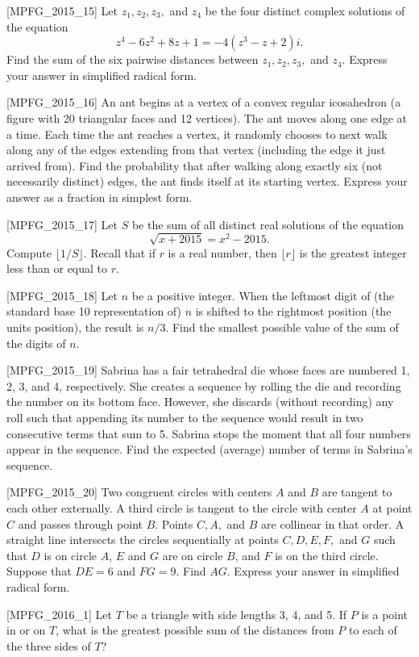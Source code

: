 [MPFG_2015_15]
Let $z_1, z_2, z_3,$ and $z_4$ be the four distinct complex solutions of the equation
$$z^4 - 6z^2 + 8z + 1 = -4(z^3 - z + 2)i.$$
Find the sum of the six pairwise distances between $z_1, z_2, z_3,$ and $z_4$. Express your answer in simplified radical form.

[MPFG_2015_16]
An ant begins at a vertex of a convex regular icosahedron (a figure with 20 triangular faces and 12 vertices). The ant moves along one edge at a time. Each time the ant reaches a vertex, it randomly chooses to next walk along any of the edges extending from that vertex (including the edge it just arrived from). Find the probability that after walking along exactly six (not necessarily distinct) edges, the ant finds itself at its starting vertex. Express your answer as a fraction in simplest form.

[MPFG_2015_17]
Let $S$ be the sum of all distinct real solutions of the equation
$$\sqrt{x+2015} = x^2 - 2015.$$
Compute $\lfloor 1/S \rfloor$. Recall that if $r$ is a real number, then $\lfloor r \rfloor$ is the greatest integer less than or equal to $r$.

[MPFG_2015_18]
Let $n$ be a positive integer. When the leftmost digit of (the standard base 10 representation of) $n$ is shifted to the rightmost position (the units position), the result is $n/3$. Find the smallest possible value of the sum of the digits of $n$.

[MPFG_2015_19]
Sabrina has a fair tetrahedral die whose faces are numbered 1, 2, 3, and 4, respectively. She creates a sequence by rolling the die and recording the number on its bottom face. However, she discards (without recording) any roll such that appending its number to the sequence would result in two consecutive terms that sum to 5. Sabrina stops the moment that all four numbers appear in the sequence. Find the expected (average) number of terms in Sabrina's sequence.

[MPFG_2015_20]
Two congruent circles with centers $A$ and $B$ are tangent to each other externally. A third circle is tangent to the circle with center $A$ at point $C$ and passes through point $B$. Points $C, A,$ and $B$ are collinear in that order. A straight line intersects the circles sequentially at points $C, D, E, F,$ and $G$ such that $D$ is on circle $A$, $E$ and $G$ are on circle $B$, and $F$ is on the third circle. Suppose that $DE=6$ and $FG=9$. Find $AG$. Express your answer in simplified radical form.

[MPFG_2016_1]
Let $T$ be a triangle with side lengths 3, 4, and 5. If $P$ is a point in or on $T$, what is the greatest possible sum of the distances from $P$ to each of the three sides of $T$?

